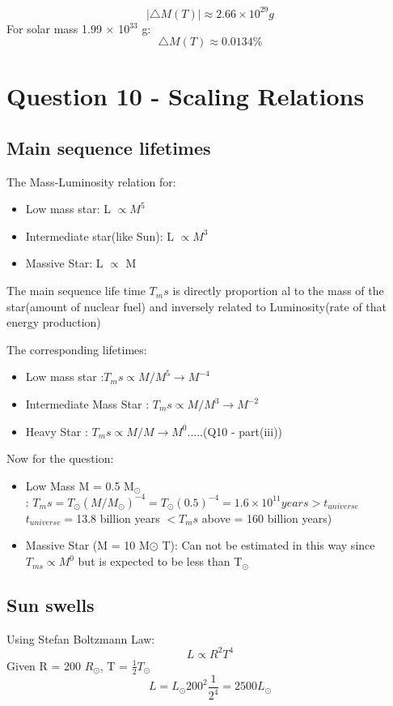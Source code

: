 \documentclass[11pt]{article}
\begin{document}
	\[
		|\triangle M(T)| \approx 2.66 \times 10^{29} g
	\]
	For solar mass 1.99 $\times$ 10$^{33}$ g:
	\[
		\boxed{\triangle M(T) \approx 0.0134 \%}	
	\]
	
	\section{\color{teal} Question 10 - Scaling Relations}
	
	\subsection{Main sequence lifetimes}
	
	The Mass-Luminosity relation for:
	\begin{itemize}
		\item Low mass star: L $\propto M^5 $
		\item Intermediate star(like Sun): L $\propto M^3$
		\item Massive Star: L $\propto$ M 
	\end{itemize}
	
	The main sequence life time $T_ms$ is directly proportion al to the mass of the star(amount of nuclear fuel) and inversely related to Luminosity(rate of that energy production) 
	
	The corresponding lifetimes:
	
	\begin{itemize}
		\item Low mass star :$T_ms \propto M/M^5 \rightarrow M^{-4}$
		\item Intermediate Mass Star : $T_ms \propto M/M^3 \rightarrow M^{-2}$
		\item Heavy Star : $\boxed{T_ms \propto M/M \rightarrow M^0}$.....(Q10 - part(iii))
	\end{itemize}
	
	Now for the question:
	\begin{itemize}
		\item Low Mass M = 0.5 M$_\odot$\\ : $\boxed{T_ms = T_\odot (M/M_\odot)^{-4} = T_\odot (0.5)^{-4} = 1.6 \times 10^{11} years > t_{universe}}$\\
		$t_{universe}  = $13.8 billion years $< T_ms$ above = 160 billion years)
		
		\item Massive Star (M = 10 M$\odot$ T): Can not be estimated in this way since $T_{ms} \propto M^0$ but is expected to be less than T$_\odot$
		 
	\end{itemize}
	
	\subsection{Sun swells}
	
	Using Stefan Boltzmann Law:
	\[
		L \propto R^2 T^4
	\]
	Given R = 200 $R_\odot$, T = $\frac{1}{2}T_\odot$
	\[
		L = L_\odot 200^2 \frac{1}{2^4} = 2500 L_\odot
	\]
	
	
	
\end{document}
